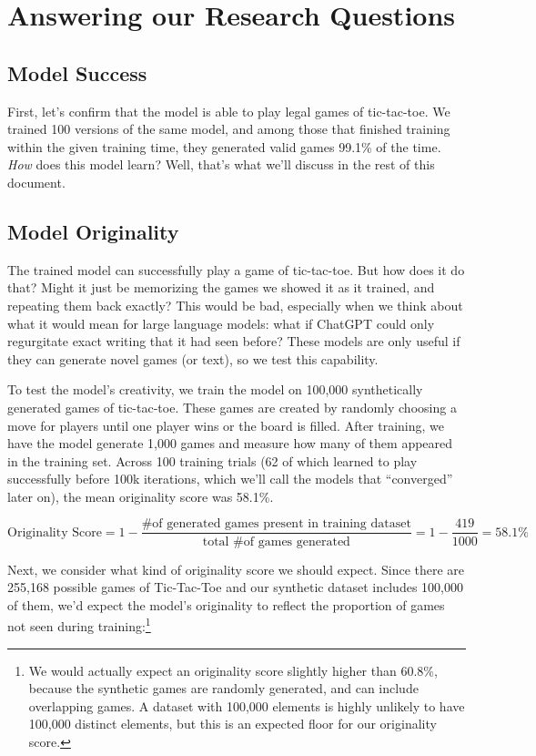 \documentclass[11pt]{article}
\begin{document}
    \section{Answering our Research
Questions}\label{answering-our-research-questions}

\subsection{Model Success}\label{model-success}

First, let's confirm that the model is able to play legal games of
tic-tac-toe. We trained 100 versions of the same model, and among those
that finished training within the given training time, they generated
valid games 99.1\% of the time. \emph{How} does this model learn? Well,
that's what we'll discuss in the rest of this document.

    \subsection{Model Originality}\label{model-originality}

The trained model can successfully play a game of tic-tac-toe. But how
does it do that? Might it just be memorizing the games we showed it as
it trained, and repeating them back exactly? This would be bad,
especially when we think about what it would mean for large language
models: what if ChatGPT could only regurgitate exact writing that it had
seen before? These models are only useful if they can generate novel
games (or text), so we test this capability.

To test the model's creativity, we train the model on 100,000
synthetically generated games of tic-tac-toe. These games are
created by randomly choosing a move for players until one player wins or
the board is filled. After training, we have the model generate 1,000
games and measure how many of them appeared in the training set. Across
100 training trials (62 of which learned to play successfully before
100k iterations, which we'll call the models that ``converged'' later
on), the mean originality score was 58.1\%.

\[
\text{Originality Score} = 1 - \frac{\text{\# of generated games present in training dataset}}{\text{total \# of games generated}} = 1 - \frac{419}{\text{1000}} = 58.1\%
\]

Next, we consider what kind of originality score we should expect. Since
there are 255,168 possible games of Tic-Tac-Toe and our synthetic
dataset includes 100,000 of them, we'd expect the model's originality to
reflect the proportion of games not seen during training:\footnote{We would actually expect an originality score slightly
higher than 60.8\%, because the synthetic games are randomly generated,
and can include overlapping games. A dataset with 100,000 elements is
highly unlikely to have 100,000 distinct elements, but this is an
expected floor for our originality score.}
\end{document}
